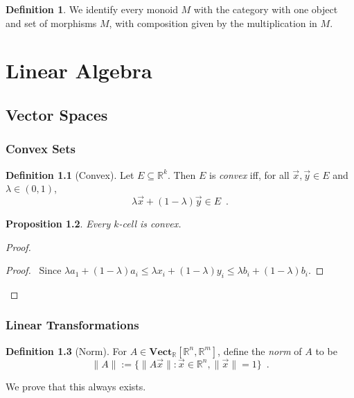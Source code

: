 \documentclass{book}
\let\qed\relax
\newtheorem{prop}{Proposition}[chapter]
\theoremstyle{definition}
\newtheorem{df}[prop]{Definition}
\begin{document}
\begin{df}
We identify every monoid $M$ with the category with one object and set of morphisms $M$, with composition given by the multiplication in $M$.
\end{df}

\part{Linear Algebra}

\newcommand{\tr}[1]{\ensuremath{\operatorname{tr}}}

\chapter{Vector Spaces}

\section{Convex Sets}

\begin{df}[Convex]
Let $E \subseteq \mathbb{R}^k$. Then $E$ is \emph{convex} iff, for all $\vec{x}, \vec{y} \in E$ and $\lambda \in (0,1)$,
\[ \lambda \vec{x} + (1 - \lambda) \vec{y} \in E \enspace . \]
\end{df}

\begin{prop}
Every $k$-cell is convex.
\end{prop}

\begin{proof}
\pf
{}
\begin{proof}
\pf\ Since $\lambda a_1 + (1-\lambda) a_i \leq \lambda x_i + (1 - \lambda) y_i \leq \lambda b_i + (1 - \lambda) b_i$.
\end{proof}
\qed
\end{proof}

\section{Linear Transformations}

\begin{df}[Norm]
For $A \in \mathbf{Vect}_\mathbb{R}[\mathbb{R}^n, \mathbb{R}^m]$, define the \emph{norm} of $A$ to be
\[ \| A \| := \{ \| A \vec{x} \| : \vec{x} \in \mathbb{R}^n, \| \vec{x} \| = 1 \} \enspace . \]

We prove that this always exists.
\end{df}
\end{document}
